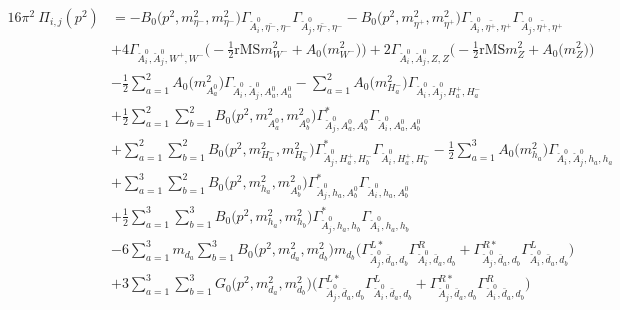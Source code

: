 \begin{itemize}
\begin{align} 
16\pi^2 \ \Pi_{i,j}(p^2) &= - {B_0\Big(p^{2},m^2_{\eta^-},m^2_{\eta^-}\Big)} {\Gamma_{\check{A}^0_{{i}},\bar{\eta^-},\eta^-}} {\Gamma_{\check{A}^0_{{j}},\bar{\eta^-},\eta^-}} - {B_0\Big(p^{2},m^2_{\eta^+},m^2_{\eta^+}\Big)} {\Gamma_{\check{A}^0_{{i}},\bar{\eta^+},\eta^+}} {\Gamma_{\check{A}^0_{{j}},\bar{\eta^+},\eta^+}} \nonumber \\ 
 &+4 {\Gamma_{\check{A}^0_{{i}},\check{A}^0_{{j}},W^+,W^-}} \Big(-\frac{1}{2} \text{rMS} m^2_{W^-}  + {A_0\Big(m^2_{W^-}\Big)}\Big)+2 {\Gamma_{\check{A}^0_{{i}},\check{A}^0_{{j}},Z,Z}} \Big(-\frac{1}{2} \text{rMS} m^2_{Z}  + {A_0\Big(m^2_{Z}\Big)}\Big)\nonumber \\ 
 &-\frac{1}{2} \sum_{a=1}^{2}{A_0\Big(m^2_{A^0_{{a}}}\Big)} {\Gamma_{\check{A}^0_{{i}},\check{A}^0_{{j}},A^0_{{a}},A^0_{{a}}}}  - \sum_{a=1}^{2}{A_0\Big(m^2_{H^-_{{a}}}\Big)} {\Gamma_{\check{A}^0_{{i}},\check{A}^0_{{j}},H^+_{{a}},H^-_{{a}}}}  \nonumber \\ 
 &+\frac{1}{2} \sum_{a=1}^{2}\sum_{b=1}^{2}{B_0\Big(p^{2},m^2_{A^0_{{a}}},m^2_{A^0_{{b}}}\Big)} {\Gamma^*_{\check{A}^0_{{j}},A^0_{{a}},A^0_{{b}}}} {\Gamma_{\check{A}^0_{{i}},A^0_{{a}},A^0_{{b}}}}  \nonumber \\ 
 &+\sum_{a=1}^{2}\sum_{b=1}^{2}{B_0\Big(p^{2},m^2_{H^-_{{a}}},m^2_{H^-_{{b}}}\Big)} {\Gamma^*_{\check{A}^0_{{j}},H^+_{{a}},H^-_{{b}}}} {\Gamma_{\check{A}^0_{{i}},H^+_{{a}},H^-_{{b}}}} -\frac{1}{2} \sum_{a=1}^{3}{A_0\Big(m^2_{h_{{a}}}\Big)} {\Gamma_{\check{A}^0_{{i}},\check{A}^0_{{j}},h_{{a}},h_{{a}}}}  \nonumber \\ 
 &+\sum_{a=1}^{3}\sum_{b=1}^{2}{B_0\Big(p^{2},m^2_{h_{{a}}},m^2_{A^0_{{b}}}\Big)} {\Gamma^*_{\check{A}^0_{{j}},h_{{a}},A^0_{{b}}}} {\Gamma_{\check{A}^0_{{i}},h_{{a}},A^0_{{b}}}} \nonumber \\ 
 &+\frac{1}{2} \sum_{a=1}^{3}\sum_{b=1}^{3}{B_0\Big(p^{2},m^2_{h_{{a}}},m^2_{h_{{b}}}\Big)} {\Gamma^*_{\check{A}^0_{{j}},h_{{a}},h_{{b}}}} {\Gamma_{\check{A}^0_{{i}},h_{{a}},h_{{b}}}}  \nonumber \\ 
 &-6 \sum_{a=1}^{3}m_{d_{{a}}} \sum_{b=1}^{3}{B_0\Big(p^{2},m^2_{d_{{a}}},m^2_{d_{{b}}}\Big)} m_{d_{{b}}} \Big({\Gamma^{L*}_{\check{A}^0_{{j}},\bar{d}_{{a}},d_{{b}}}} {\Gamma^R_{\check{A}^0_{{i}},\bar{d}_{{a}},d_{{b}}}}  + {\Gamma^{R*}_{\check{A}^0_{{j}},\bar{d}_{{a}},d_{{b}}}} {\Gamma^L_{\check{A}^0_{{i}},\bar{d}_{{a}},d_{{b}}}} \Big)  \nonumber \\ 
 &+3 \sum_{a=1}^{3}\sum_{b=1}^{3}{G_0\Big(p^{2},m^2_{d_{{a}}},m^2_{d_{{b}}}\Big)} \Big({\Gamma^{L*}_{\check{A}^0_{{j}},\bar{d}_{{a}},d_{{b}}}} {\Gamma^L_{\check{A}^0_{{i}},\bar{d}_{{a}},d_{{b}}}}  + {\Gamma^{R*}_{\check{A}^0_{{j}},\bar{d}_{{a}},d_{{b}}}} {\Gamma^R_{\check{A}^0_{{i}},\bar{d}_{{a}},d_{{b}}}} \Big) \nonumber \\ 

\end{align}
\end{itemize}
